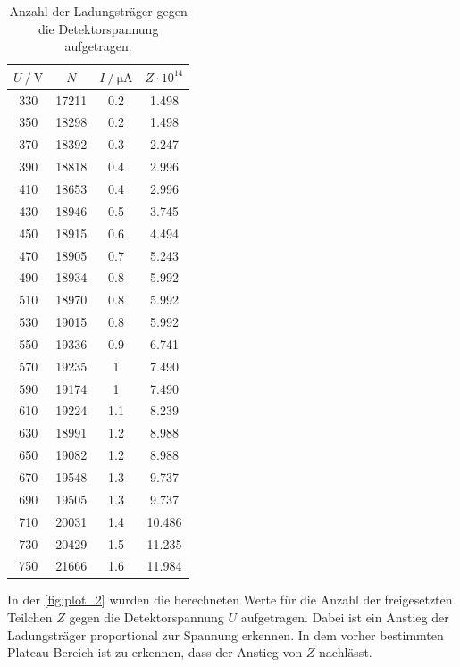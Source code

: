 \begin{table}[H]
    \centering
    \caption{Anzahl der Ladungsträger gegen die Detektorspannung aufgetragen.}
    \label{tab:ladungs}
\begin{tabular}{c c c c}
    \toprule
    $U \mathbin{/} \mathrm{V}$ & $N$ &  $I \mathbin{/} \unit{\micro\ampere}$ & $Z \cdot 10^{14}$\\
    \midrule
         330 &    17211 &   0.2 & 1.498\\
         350 &    18298 &   0.2 & 1.498\\
         370 &    18392 &   0.3 & 2.247\\
         390 &    18818 &   0.4 & 2.996\\
         410 &    18653 &   0.4 & 2.996\\
         430 &    18946 &   0.5 & 3.745\\
         450 &    18915 &   0.6 & 4.494\\
         470 &    18905 &   0.7 & 5.243\\
         490 &    18934 &   0.8 & 5.992\\
         510 &    18970 &   0.8 & 5.992\\
         530 &    19015 &   0.8 & 5.992\\
         550 &    19336 &   0.9 & 6.741\\
         570 &    19235 &     1 & 7.490\\
         590 &    19174 &     1 & 7.490\\
         610 &    19224 &   1.1 & 8.239\\
         630 &    18991 &   1.2 & 8.988\\
         650 &    19082 &   1.2 & 8.988\\
         670 &    19548 &   1.3 & 9.737\\
         690 &    19505 &   1.3 & 9.737\\
         710 &    20031 &   1.4 & 10.486\\
         730 &    20429 &   1.5 & 11.235\\
         750 &    21666 &   1.6 & 11.984\\
    \bottomrule
    \end{tabular}
\end{table}

In der \autoref{fig:plot_2} wurden die berechneten Werte für die Anzahl der freigesetzten Teilchen $Z$ gegen die Detektorspannung $U$
aufgetragen. Dabei ist ein Anstieg der Ladungsträger proportional zur Spannung erkennen. In dem vorher bestimmten
Plateau-Bereich ist zu erkennen, dass der Anstieg von $Z$ nachlässt.

